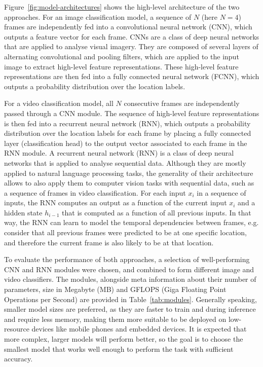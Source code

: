 \documentclass{article}
\begin{document}
  Figure~\ref{fig:model-architectures} shows the high-level architecture of the two
  approaches. For an image classification model, a sequence of $N$ (here $N=4$)
  frames are independently fed into a convolutional neural network (CNN), which
  outputs a feature vector for each frame. CNNs are a class of deep neural
  networks that are applied to analyse visual imagery. They are composed of
  several layers of alternating convolutional and pooling filters, which are
  applied to the input image to extract high-level feature representations.
  These high-level feature representations are then fed into a fully connected
  neural network (FCNN), which outputs a probability distribution over the
  location labels.

  For a video classification model, all $N$ consecutive frames are independently
  passed through a CNN module. The sequence of high-level feature
  representations is then fed into a recurrent neural network (RNN), which
  outputs a probability distribution over the location labels for each frame by
  placing a fully connected layer (classification head) to the output vector
  associated to each frame in the RNN module. A recurrent neural network (RNN)
  is a class of deep neural networks that is applied to analyse sequential data.
  Although they are mostly applied to natural language processing tasks, the
  generality of their architecture allows to also apply them to computer vision
  tasks with sequential data, such as a sequence of frames in video
  classification. For each input $x_i$ in a sequence of inputs, the RNN computes
  an output as a function of the current input $x_i$ and a hidden state
  $h_{i-1}$ that is computed as a function of all previous inputs. In that way,
  the RNN can learn to model the temporal dependencies between frames, e.g.
  consider that all previous frames were predicted to be at one specific
  location, and therefore the current frame is also likely to be at that
  location.

  To evaluate the performance of both approaches, a selection of well-performing
  CNN and RNN modules were chosen, and combined to form different image and
  video classifiers. The modules, alongside meta information about their number
  of parameters, size in Megabyte (MB) and GFLOPS (Giga Floating Point
  Operations per Second) are provided in Table~\ref{tab:modules}. Generally
  speaking, smaller model sizes are preferred, as they are faster to train and
  during inference and require less memory, making them more suitable to be
  deployed on low-resource devices like mobile phones and embedded devices. It
  is expected that more complex, larger models will perform better, so the goal
  is to choose the smallest model that works well enough to perform the task
  with sufficient accuracy.
\end{document}
